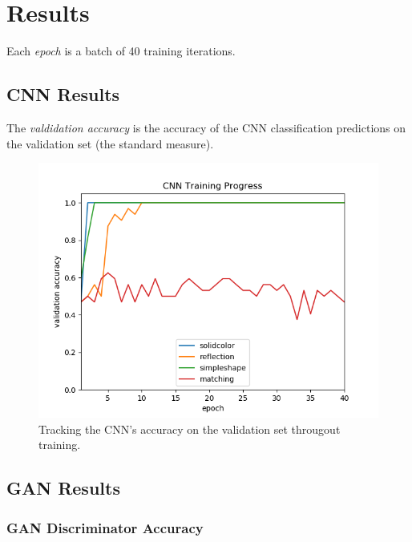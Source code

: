 \documentclass{article}
\renewcommand{\it}{\textit}
\begin{document}
\newpage
\section{Results}

Each \it{epoch} is a batch of 40 training iterations.

\subsection{CNN Results}

The \it{valdidation accuracy} is the accuracy of the CNN classification predictions on the validation set (the standard measure).

\begin{figure}[ht]
\label{fig:cnn-results}
\centering
\includegraphics[width=\textwidth]{cnn-results.png}
\caption{Tracking the CNN's accuracy on the validation set througout training.}
\end{figure}

\newpage

\subsection{GAN Results}

\subsubsection{GAN Discriminator Accuracy}
\end{document}
